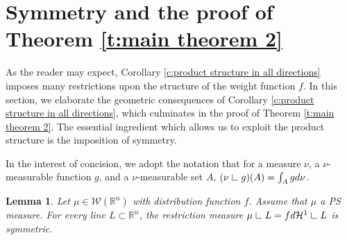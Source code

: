 \documentclass[12pt]{amsart}
\numberwithin{equation}{section}
\theoremstyle{plain}
\newtheorem{lemma}[theorem]{Lemma}
\theoremstyle{definition}
\newcommand{\res}{\hbox{ {\vrule height .22cm}{\leaders\hrule\hskip.2cm} }}
\begin{document}
\section{Symmetry and the proof of Theorem \ref{t:main theorem 2}}

As the reader may expect, Corollary \ref{c:product structure in all directions} imposes many restrictions upon the structure of the weight function $f$. In this section, we elaborate the geometric consequences  of Corollary \ref{c:product structure in all directions}, which culminates in the proof of Theorem \ref{t:main theorem 2}.  The essential ingredient which allows us to exploit the product structure is the imposition of symmetry.  

In the interest of concision, we adopt the notation that for a measure $\nu$, a $\nu$-measurable function $g$, and a $\nu$-measurable set $A$, $(\nu \res g) (A) = \int_A g d\nu$. 

\begin{lemma}\label{l:restrictions are symmetric}
    Let $\mu \in \mathscr{W}(\mathbb{R}^n)$ with distribution function $f$.  Assume that $\mu$ a PS measure. For every line $L \subset \mathbb{R}^n$, the restriction measure $\mu \res L = fd\mathcal{H}^1\res L$ is symmetric.
\end{lemma}
\end{document}

